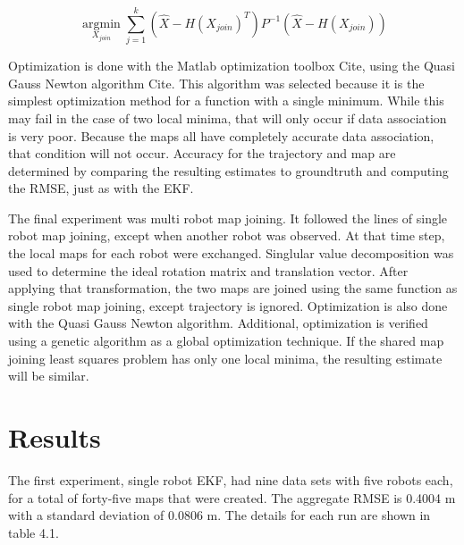 \documentclass[12pt]{report}
\begin{document}
\begin{equation}
\underset{X_{join}}{\operatorname{argmin}}  \sum \limits_{j=1}^k (\hat{X} - H(X_{join})^T) P^{-1} (\hat{X} - H(X_{join}))
\end{equation}

Optimization is done with the Matlab optimization toolbox {Cite}, using the Quasi Gauss Newton algorithm {Cite}.  This algorithm was selected because it is the simplest optimization method for a function with a single minimum.  While this may fail in the case of two local minima, that will only occur if data association is very poor.  Because the maps all have completely accurate data association, that condition will not occur.  Accuracy for the trajectory and map are determined by comparing the resulting estimates to groundtruth and computing the RMSE, just as with the EKF.

The final experiment was multi robot map joining.  It followed the lines of single robot map joining, except when another robot was observed.  At that time step, the local maps for each robot were exchanged.  Singlular value decomposition was used to determine the ideal rotation matrix and translation vector.  After applying that transformation, the two maps are joined using the same function as single robot map joining, except trajectory is ignored.  Optimization is also done with the Quasi Gauss Newton algorithm.  Additional, optimization is verified using a genetic algorithm as a global optimization technique.  If the shared map joining least squares problem has only one local minima, the resulting estimate will be similar.  



\chapter{Results}

The first experiment, single robot EKF, had nine data sets with five robots each, for a total of forty-five maps that were created.  The aggregate RMSE is 0.4004 m with a standard deviation of 0.0806 m.  The details for each run are shown in table 4.1.   
\end{document}
